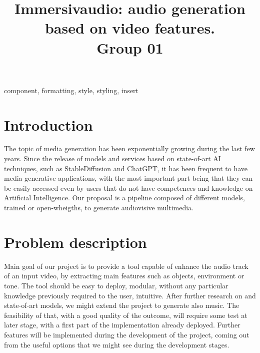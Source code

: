 \documentclass[conference]{IEEEtran}
\begin{document}
\title{Immersivaudio: audio generation based on video features.\\
{\footnotesize Group 01}
}


\author{
\and
{}
\and
{}
}

\maketitle


\begin{IEEEkeywords}
component, formatting, style, styling, insert
\end{IEEEkeywords}

\section{Introduction}
The topic of media generation has been exponentially growing during the last few years. Since the release of models and services based on state-of-art AI techniques, such as StableDiffusion and ChatGPT, it has been frequent to have media generative applications, with the most important part being that they can be easily accessed even by users that do not have competences and knowledge on Artificial Intelligence. 
Our proposal is a pipeline composed of different models, trained or open-wheigths, to generate audiovisive multimedia. 

\section{Problem description}
Main goal of our project is to provide a tool capable of enhance the audio track of an input video, by extracting main features such as objects, environment or tone. The tool should be easy to deploy, modular, without any particular knowledge previously required to the user, intuitive. After further research on and state-of-art models, we might extend the project to generate also music. The feasibility of that, with a good quality of the outcome, will require some test at later stage, with a first part of the implementation already deployed. Further features will be implemented during the development of the project, coming out from the useful options that we might see during the development stages. 
\end{document}
